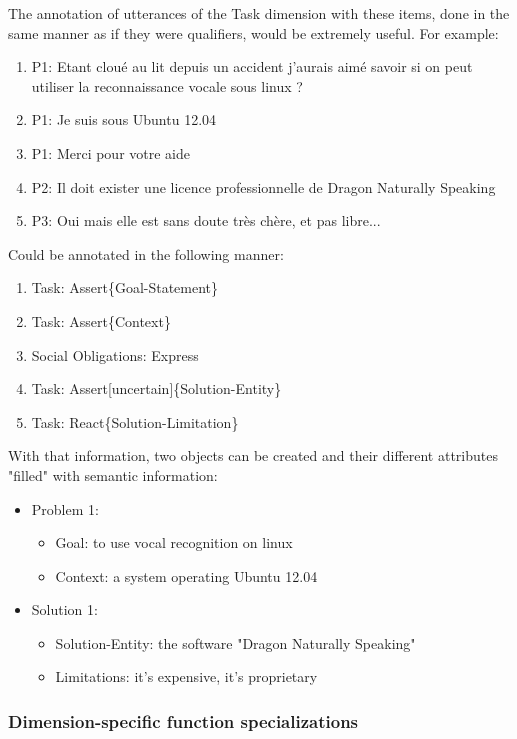 The annotation of utterances of the Task dimension with these items, done in the same manner as if they were qualifiers, would be extremely useful. For example:

\begin{enumerate}
	\item P1: Etant cloué au lit depuis un accident j'aurais aimé savoir si on peut utiliser la reconnaissance vocale sous linux ?
	\item P1: Je suis sous Ubuntu 12.04
	\item P1: Merci pour votre aide
	\item P2: Il doit exister une licence professionnelle de Dragon Naturally Speaking
	\item P3: Oui mais elle est sans doute très chère, et pas libre...
\end{enumerate}

Could be annotated in the following manner:

\begin{enumerate}
	\item Task: Assert\{Goal-Statement\}
	\item Task: Assert\{Context\}
	\item Social Obligations: Express
	\item Task: Assert[uncertain]\{Solution-Entity\}
	\item Task: React\{Solution-Limitation\}
\end{enumerate}

With that information, two objects can be created and their different attributes "filled" with semantic information:

\begin{itemize}
	\item Problem 1:
		\begin{itemize}
			\item Goal: to use vocal recognition on linux
			\item Context: a system operating Ubuntu 12.04
		\end{itemize}
	\item Solution 1:
		\begin{itemize}
			\item Solution-Entity: the software "Dragon Naturally Speaking"
			\item Limitations: it's expensive, it's proprietary
		\end{itemize}
\end{itemize}

\subsubsection{Dimension-specific function specializations}

